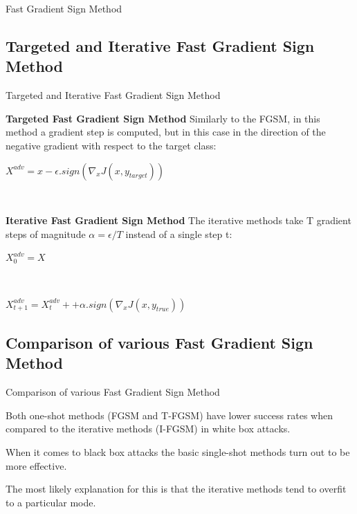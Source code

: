 \documentclass{beamer}
\begin{document}
\begin{darkframes}
\begin{frame}{Fast Gradient Sign Method}
    \end{frame}

    \subsection{Targeted and Iterative Fast Gradient Sign Method}
    \begin{frame}{Targeted and Iterative Fast Gradient Sign Method}
        
        \textbf{Targeted Fast Gradient Sign Method}
        Similarly to the FGSM, in this method a gradient step is computed, but in this case in the direction of the negative gradient with respect to the target class:\\\bigskip
        
        \centerline{$X^{adv} = x - \epsilon . sign(\nabla_{x}J(x, y_{target}))$}\\\bigskip
        
        
        \textbf{Iterative Fast Gradient Sign Method}
        The iterative methods take T gradient steps of magnitude 
        $ \alpha = \epsilon / T $ instead of a single step t:
        
        \centerline{$X^{adv}_{0} = X$}\\
        \centerline{$X^{adv}_{t+1} = X^{adv}_{t} + + \alpha . sign(\nabla_{x}J(x, y_{true}))$}
        
    \end{frame}
   
    \subsection{Comparison of various Fast Gradient Sign Method} 
    \begin{frame}{Comparison of various Fast Gradient Sign Method}
        
        Both one-shot methods (FGSM and T-FGSM) have lower success rates when compared to the iterative methods (I-FGSM) in white box attacks.\\\bigskip
        
        When it comes to black box attacks the basic single-shot methods turn out to be more effective.\\\bigskip
        
        The most likely explanation for this is that the iterative methods tend to overfit to a particular mode.
        
    \end{frame}
    

\end{darkframes}
\end{document}
